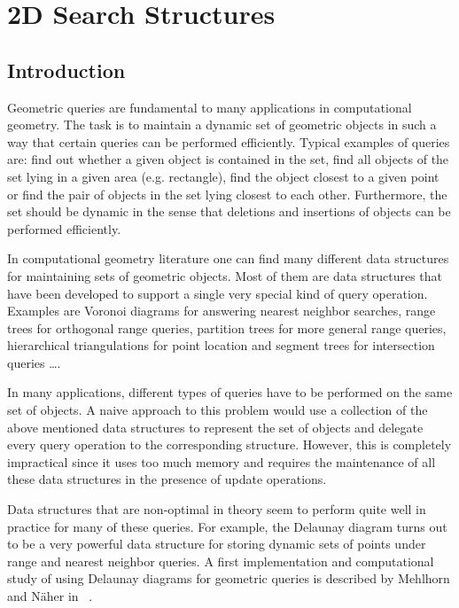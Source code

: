 
\ccParDims

\chapter{2D Search Structures}
\label{chapterPoint_set_2}


\section{Introduction}

Geometric queries are fundamental to many applications in computational
geometry. The task is to maintain a dynamic set of geometric objects
in such a way that certain queries can be performed efficiently.
Typical examples of queries are:
find out whether a given object is contained in the set,
find all objects of the set lying in a given area (e.g. rectangle),
find the object closest to a given point or
find the pair of objects in the set lying closest to each other. 
Furthermore, the set should be dynamic in the sense that deletions and 
insertions of objects can be performed efficiently.

In computational geometry literature one can find many different data structures for
maintaining sets of geometric objects. Most of them are data structures 
that have been developed to support a single very special kind of query 
operation.
Examples are Voronoi diagrams for answering nearest neighbor
searches, range trees for orthogonal range queries, partition trees
for more general range queries, hierarchical triangulations for point
location and segment trees for intersection queries \dots.

In many applications, different types of queries have to be
performed on the same set of objects. A naive approach to this
problem would use a collection of the above mentioned data structures to
represent the set of objects and delegate every query operation to
the corresponding structure.
However, this is completely impractical since it uses too much
memory and requires the maintenance of all these data structures in the presence of
update operations.

Data structures that are non-optimal in theory seem to perform quite well in
practice for many of these queries.
For example, the Delaunay diagram turns out to be a very powerful
data structure for storing dynamic sets of points under range and nearest
neighbor queries. A first implementation and computational
study of using Delaunay diagrams for geometric queries is described by
Mehlhorn and N\"aher in ~\cite{LEDAbook}.

